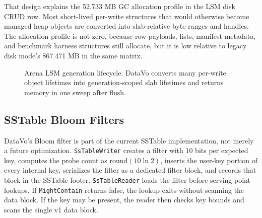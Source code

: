 \documentclass[11pt]{article}
\begin{document}
That design explains the \num{52.733} MB GC allocation profile in the LSM disk CRUD row. Most short-lived per-write structures that would otherwise become managed heap objects are converted into slab-relative byte ranges and handles. The allocation profile is not zero, because row payloads, lists, manifest metadata, and benchmark harness structures still allocate, but it is low relative to legacy disk mode's \num{867.471} MB in the same matrix.

\begin{figure}[H]
\centering
{}
\caption{Arena LSM generation lifecycle. DataVo converts many per-write object lifetimes into generation-scoped slab lifetimes and returns memory in one sweep after flush.}
\label{fig:lsm-lifecycle}
\end{figure}

\subsection{SSTable Bloom Filters}
DataVo's Bloom filter is part of the current SSTable implementation, not merely a future optimization. \texttt{SsTableWriter} creates a filter with 10 bits per expected key, computes the probe count as \(\mathrm{round}(10\ln 2)\), inserts the user-key portion of every internal key, serializes the filter as a dedicated filter block, and records that block in the SSTable footer. \texttt{SsTableReader} loads the filter before serving point lookups. If \texttt{MightContain} returns false, the lookup exits without scanning the data block. If the key may be present, the reader then checks key bounds and scans the single v1 data block.
\end{document}
